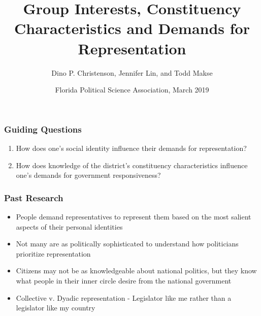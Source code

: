 \documentclass[14pt]{beamer}
\begin{document}
\author[D. Christenson, J. Lin, and T. Makse] %
{Dino P. Christenson, Jennifer Lin, and Todd Makse}
\title[Demands for Representation]{Group Interests, Constituency Characteristics and Demands for Representation}
	\date[FPSA 2019]{Florida Political Science Association, March 2019}
	\begin{frame}[plain]
	\maketitle
\end{frame}


\begin{frame}
\frametitle{Guiding Questions}
\begin{enumerate}
	\item How does one's social identity influence their demands for representation?
	\item How does knowledge of the district's constituency characteristics influence one's demands for government responsiveness? 
\end{enumerate}
\end{frame}

\begin{frame}
\frametitle{Past Research}
\begin{itemize}
	\item People demand representatives to represent them based on the most salient aspects of their personal identities
	\item Not many are as politically sophisticated to understand how politicians prioritize representation
	\item Citizens may not be as knowledgeable about national politics, but they know what people in their inner circle desire from the national government
	\item Collective v. Dyadic representation - Legislator like me rather than a legislator like my country
\end{itemize}
\end{frame}
\end{document}
